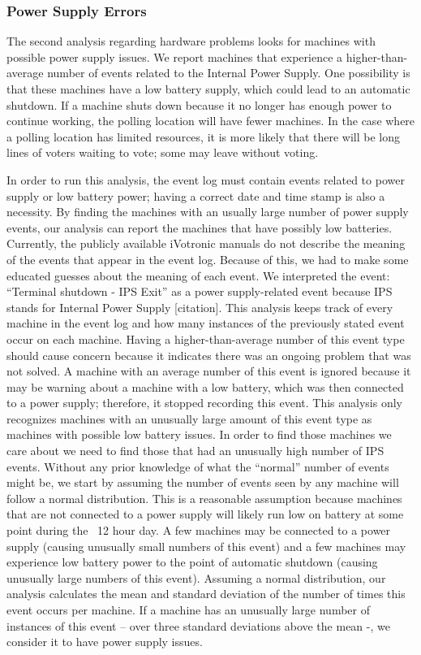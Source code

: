 \subsubsection{Power Supply Errors}
The second analysis regarding hardware problems looks for machines with possible power supply issues.  We report machines that experience a higher-than-average number of events related to the Internal Power Supply. One possibility is that these machines have a low battery supply, which could lead to an automatic shutdown.  If a machine shuts down because it no longer has enough power to continue working, the polling location will have fewer machines.  In the case where a polling location has limited resources, it is more likely that there will be long lines of voters waiting to vote; some may leave without voting.  

In order to run this analysis, the event log must contain events related to power supply or low battery power; having a correct date and time stamp is also a necessity.  By finding the machines with an usually large number of power supply events, our analysis can report the machines that have possibly low batteries.  Currently, the publicly available iVotronic manuals do not describe the meaning of the events that appear in the event log.  Because of this, we had to make some educated guesses about the meaning of each event.  We interpreted the event: \textquotedblleft Terminal shutdown - IPS Exit\textquotedblright \hspace{1 mm} as a power supply-related event because IPS stands for Internal Power Supply [citation].  This analysis keeps track of every machine in the event log and how many instances of the previously stated event occur on each machine.  Having a higher-than-average number of this event type should cause concern because it indicates there was an ongoing problem that was not solved. A machine with an average number of this event is ignored because it may be warning about a machine with a low battery, which was then connected to a power supply; therefore, it stopped recording this event. This analysis only recognizes machines with an unusually large amount of this event type as machines with possible low battery issues. In order to find those machines we care about we need to find those that had an unusually high number of IPS events. Without any prior knowledge of what the \textquotedblleft normal\textquotedblright \hspace{1 mm} number of events might be, we start by assuming the number of events seen by any machine will follow a normal distribution. This is a reasonable assumption because machines that are not connected to a power supply will likely run low on battery at some point during the ~12 hour day. A few machines may be connected to a power supply (causing unusually small numbers of this event) and a few machines may experience low battery power to the point of automatic shutdown (causing unusually large numbers of this event).  Assuming a normal distribution, our analysis calculates the mean and standard deviation of the number of times this event occurs per machine.  If a machine has an unusually large number of instances of this event – over three standard deviations above the mean -, we consider it to have power supply issues.    

